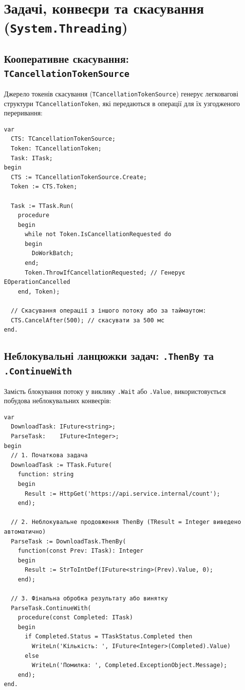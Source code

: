 \documentclass[11pt,a4paper]{article}
\begin{document}
\newpage

\section{Задачі, конвеєри та скасування (\texttt{System.Threading})}

\subsection{Кооперативне скасування: \texttt{TCancellationTokenSource}}
Джерело токенів скасування (\texttt{TCancellationTokenSource}) генерує легковагові структури \texttt{TCancellationToken}, які передаються в операції для їх узгодженого переривання:

\begin{lstlisting}
var
  CTS: TCancellationTokenSource;
  Token: TCancellationToken;
  Task: ITask;
begin
  CTS := TCancellationTokenSource.Create;
  Token := CTS.Token;

  Task := TTask.Run(
    procedure
    begin
      while not Token.IsCancellationRequested do
      begin
        DoWorkBatch;
      end;
      Token.ThrowIfCancellationRequested; // Генерує EOperationCancelled
    end, Token);

  // Скасування операції з іншого потоку або за таймаутом:
  CTS.CancelAfter(500); // скасувати за 500 мс
end.
\end{lstlisting}

\subsection{Неблокувальні ланцюжки задач: \texttt{.ThenBy} та \texttt{.ContinueWith}}
Замість блокування потоку у виклику \texttt{.Wait} або \texttt{.Value}, використовується побудова неблокувальних конвеєрів:

\begin{lstlisting}
var
  DownloadTask: IFuture<string>;
  ParseTask:    IFuture<Integer>;
begin
  // 1. Початкова задача
  DownloadTask := TTask.Future(
    function: string
    begin
      Result := HttpGet('https://api.service.internal/count');
    end);

  // 2. Неблокувальне продовження ThenBy (TResult = Integer виведено автоматично)
  ParseTask := DownloadTask.ThenBy(
    function(const Prev: ITask): Integer
    begin
      Result := StrToIntDef(IFuture<string>(Prev).Value, 0);
    end);

  // 3. Фінальна обробка результату або винятку
  ParseTask.ContinueWith(
    procedure(const Completed: ITask)
    begin
      if Completed.Status = TTaskStatus.Completed then
        WriteLn('Кількість: ', IFuture<Integer>(Completed).Value)
      else
        WriteLn('Помилка: ', Completed.ExceptionObject.Message);
    end);
end.
\end{lstlisting}
\end{document}
